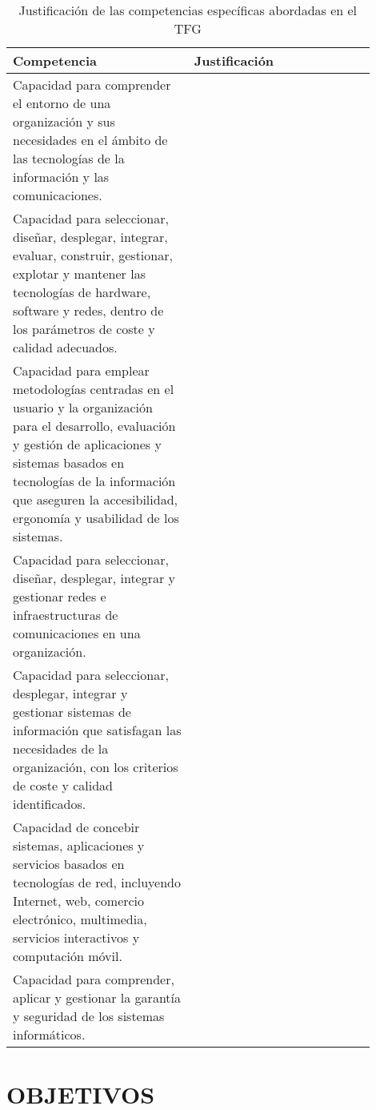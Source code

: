 \documentclass{pre-tfg}
\begin{document}
\begin{spacing}{1.0}
\begin{longtable}{p{0.45\linewidth}p{0.45\linewidth}}
  \caption{Justificación de las competencias específicas abordadas en el TFG}
  \label{tab:competencias} \\

  \textbf{Competencia} & \textbf{Justificación} \\
  \hline
  \hline
    Capacidad para comprender el entorno de una organización y sus necesidades en el ámbito de las tecnologías de la información y las comunicaciones. & \\

    Capacidad para seleccionar, diseñar, desplegar, integrar, evaluar, construir, gestionar, explotar y mantener las tecnologías de hardware, software y redes, dentro de los parámetros de coste y calidad adecuados. & \\

    Capacidad para emplear metodologías centradas en el usuario y la organización para el desarrollo, evaluación y gestión de aplicaciones y sistemas basados en tecnologías de la información que aseguren la accesibilidad, ergonomía y usabilidad de los sistemas. & \\

    Capacidad para seleccionar, diseñar, desplegar, integrar y gestionar redes e infraestructuras de comunicaciones en una organización. & \\

    Capacidad para seleccionar, desplegar, integrar y gestionar sistemas de información que satisfagan las necesidades de la organización, con los criterios de coste y calidad identificados. & \\

    Capacidad de concebir sistemas, aplicaciones y servicios basados en tecnologías de red, incluyendo Internet, web, comercio electrónico, multimedia, servicios interactivos y computación móvil. & \\

    Capacidad para comprender, aplicar y gestionar la garantía y seguridad de los sistemas informáticos. & \\

  \hline
\end{longtable}
\end{spacing}

\newpage

\section{OBJETIVOS}
\end{document}
